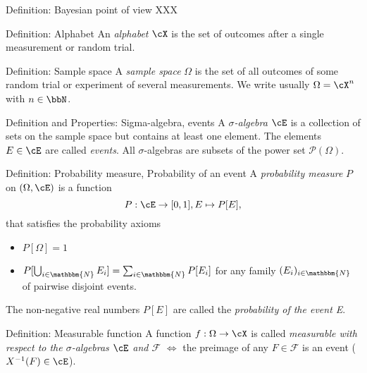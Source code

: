 \documentclass[
			print,
			a6paper,
			grid=none]{kartei}
\begin{document}
%
%
%
%
\begin{karte}{Definition: Bayesian point of view}
	XXX
\end{karte}

\begin{karte}{Definition: Alphabet}
	An \emph{alphabet} $\cX$ is the set of outcomes after a single measurement or random trial.
\end{karte}

\begin{karte}{Definition: Sample space}
	A \emph{sample space} $\Omega$ is the set of all outcomes of some random trial or experiment of several measurements. We write usually $\Omega=\cX^n$ with $n\in\bbN$.
\end{karte}

\begin{karte}{Definition and Properties: Sigma-algebra, events}
	A \emph{$\sigma$-algebra} $\cE$ is a collection of sets on the sample space but contains at least one element. The elements $E\in\cE$ are called \emph{events}. All $\sigma$-algebras are subsets of the power set $\mathcal{P}(\Omega)$.
\end{karte}

\begin{karte}{Definition: Probability measure, Probability of an event}
	A \emph{probability measure} $P$ on $(\Omega, \cE)$ is  a function 
	\begin{equation*}
		P: \cE \to [0,1], E\mapsto P[E],
	\end{equation*}
	that satisfies the probability axioms
	\begin{itemize}
		\item $P[\Omega]=1$
		\item $P[\bigcup_{i\in\mathbbm{N}}E_i]=\sum_{i\in\mathbbm{N}}P[E_i]$ for any family $(E_i)_{i\in\mathbbm{N}}$ of pairwise disjoint events.
	\end{itemize}
	The non-negative real numbers $P[E]$ are called the \emph{probability of the event E}.
\end{karte}

\begin{karte}{Definition: Measurable function}
	A function $f:\Omega\to\cX$ is called \emph{measurable with respect to the $\sigma$-algebras $\cE$ and $\mathcal{F}$} $\iff$ the preimage of any $F\in\mathcal{F}$ is an event ($X^{-1}(F)\in\cE$).
\end{karte}
\end{document}
